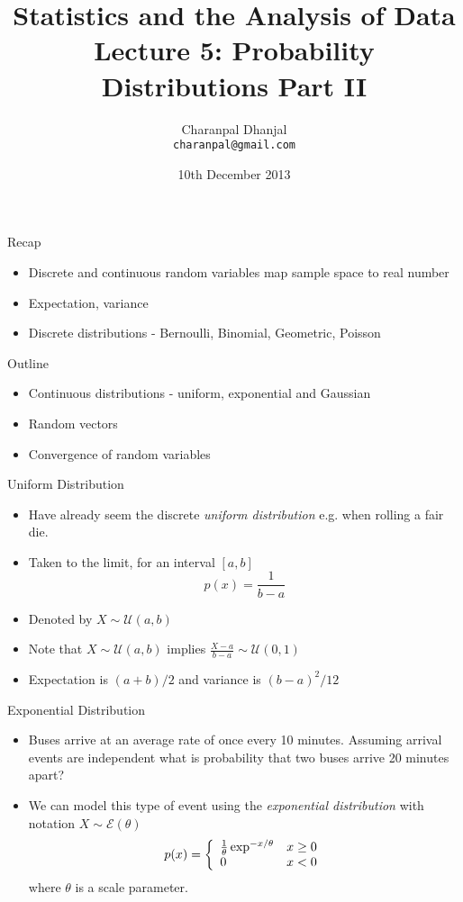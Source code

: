 \documentclass{beamer}
\title{Statistics and the Analysis of Data\\ Lecture 5: Probability Distributions Part II}
\author{Charanpal Dhanjal \\ \texttt{charanpal@gmail.com}}
\institute{\'{E}cole des Ponts}
\date{10th December 2013}
\begin{document}
\frame{\titlepage}


\begin{frame}{Recap}  
\begin{itemize} 
\item Discrete and continuous random variables map sample space to real number 
\item Expectation, variance 
\item Discrete distributions - Bernoulli, Binomial, Geometric, Poisson
\end{itemize}
\end{frame}

\begin{frame}{Outline} 
\begin{itemize} 
 \item Continuous distributions - uniform, exponential and Gaussian
 \item Random vectors 
 \item Convergence of random variables
\end{itemize}
\end{frame}

\begin{frame}{Uniform Distribution}  
 \begin{itemize} 
\item Have already seem the discrete \emph{uniform distribution} e.g. when rolling a fair die. 
\item Taken to the limit, for an interval $[a, b]$ 
\begin{displaymath} 
 p(x) = \frac{1}{b-a}
\end{displaymath}
\item Denoted by $X \sim \mathcal{U}(a, b)$
\item Note that  $X \sim \mathcal{U}(a, b)$ implies $\frac{X - a}{b - a} \sim \mathcal{U}(0, 1)$
\item Expectation is $(a+b)/2$ and variance is $(b-a)^2/12$ 
\end{itemize}
\end{frame}



\begin{frame}{Exponential Distribution} 
\begin{itemize} 
 \item Buses arrive at an average rate of once every 10 minutes. Assuming arrival events are independent what is probability that two buses arrive 20 minutes apart? 
 \item We can model this type of event using the \emph{exponential distribution} with notation $X \sim \mathcal{E}(\theta)$
 \begin{displaymath}
  p(x) = \left\{ \begin{array}{l l}\frac{1}{\theta}  \exp^{-x/\theta} & x \geq 0 \\ 0 & x < 0 \end{array} \right. 
 \end{displaymath}
  where $\theta$ is a scale parameter. 
\end{itemize}
\end{frame}
\end{document}
